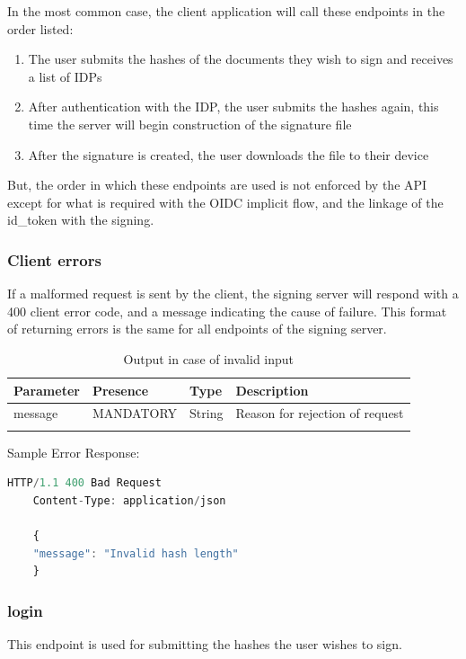In the most common case, the client application will call these endpoints in the order listed:
\begin{enumerate}
    \item The user submits the hashes of the documents they wish to sign and receives a list of IDPs
    \item After authentication with the IDP, the user submits the hashes again, this time the server will begin construction of the signature file
    \item After the signature is created, the user downloads the file to their device
\end{enumerate}

But, the order in which these endpoints are used is not enforced by the API except for what is required with the \gls{OIDC} implicit flow,
and the linkage of the id\_token with the signing.

\subsubsection{Client errors}
\label{apiclienterrors}
If a malformed request is sent by the client, the signing server will respond with a 400 client error code,
and a message indicating the cause of failure.
This format of returning errors is the same for all endpoints of the signing server.

\begin{longtable}{|l|l|l|l|}
    \hline
    \textbf{Parameter} & \textbf{Presence} & \textbf{Type} & \textbf{Description} \\ \hline
    message & MANDATORY & String & Reason for rejection of request \\ \hline
    \caption{Output in case of invalid input}
\end{longtable}

Sample Error Response:
\begin{lstlisting}[caption={Error response}, captionpos=b, language=JavaScript, label={lst:hashesresponse}]
    HTTP/1.1 400 Bad Request
    Content-Type: application/json

    {
    "message": "Invalid hash length"
    }
\end{lstlisting}

\subsubsection{login}
This endpoint is used for submitting the hashes the user wishes to sign.

